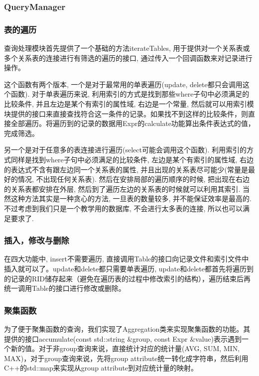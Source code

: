 \documentclass[11pt,UTF8]{report}
\begin{document}
\subsubsection{QueryManager}
\subsubsection{表的遍历}
查询处理模块首先提供了一个基础的方法iterateTables, 用于提供对一个关系表或多个关系表的连接进行有筛选的遍历的接口, 通过传入一个回调函数来对记录进行操作。

这个函数有两个版本, 一个是对于最常用的单表遍历(update, delete都只会调用这个函数). 对于单表遍历来说, 利用索引的方式是找到那些where子句中必须满足的比较条件, 并且左边是某个有索引的属性域, 右边是一个常量, 然后就可以用索引模块提供的接口来直接查找符合这一条件的记录。如果找不到这样的比较条件，则直接全部遍历。将遍历到的记录的数据用Expr的calculate功能算出条件表达式的值，完成筛选。

另一个是对于任意多的表连接进行遍历(select可能会调用这个函数). 利用索引的方式同样是找到where子句中必须满足的比较条件, 左边是某个有索引的属性域, 右边的表达式不含有跟左边同一个关系表的属性, 并且出现的关系表尽可能少(常量是最好的情况, 不出现任何关系表). 然后在安排局部的遍历顺序的时候, 把出现在右边的关系表都安排在外层, 然后到了遍历左边的关系表的时候就可以利用其索引. 当然这种方法其实是一种贪心的方法, 一旦表的数量较多, 并不能保证效率是最高的. 不过考虑到我们只是一个教学用的数据库, 不会进行太多表的连接, 所以也可以满足要求了.

\subsubsection{插入，修改与删除}
在四大功能中, insert不需要遍历, 直接调用Table的接口向记录文件和索引文件中插入就可以了。update和delete都只需要单表遍历, update和delete都首先将遍历到的记录的RID储存起来（避免在遍历表的过程中修改索引的结构），遍历结束后再统一调用Table的接口进行修改或删除。

\subsubsection{聚集函数}
为了便于聚集函数的查询，我们实现了Aggregation类来实现聚集函数的功能。其提供的接口accumulate(const std::string \&group, const Expr \&value)表示遇到一个新的值。对于非group查询来说，直接统计对应的统计量(AVG, SUM, MIN, MAX)，对于group查询来说，先将group attribute统一转化成字符串，然后利用C++的std::map来实现从group attribute到对应统计量的映射。
\end{document}
